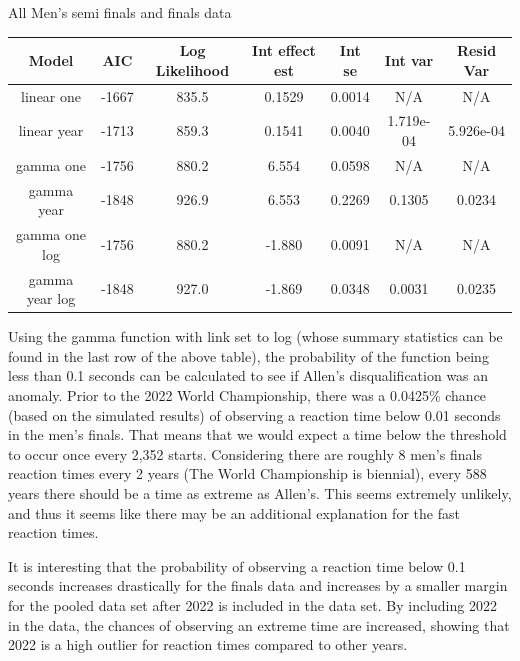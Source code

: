 \documentclass[12pt, letterpaper, titlepage]{article}
\begin{document}
All Men's semi finals and finals data
\begin{center}
  \begin{tabular}{|c  c  c  c  c  c  c |}
   \hline 
   Model & AIC & Log Likelihood & Int effect est & Int se & Int var & Resid Var \\ [0.5ex] 
   \hline\hline
   linear one & -1667 & 835.5 & 0.1529 & 0.0014 & N/A & N/A \\
   \hline
   linear year & -1713 & 859.3 & 0.1541 & 0.0040 & 1.719e-04 & 5.926e-04 \\ 
   \hline
   gamma one & -1756 & 880.2 & 6.554 & 0.0598 & N/A & N/A \\
   \hline
   gamma year & -1848 & 926.9 & 6.553 & 0.2269 & 0.1305 & 0.0234 \\
   \hline
   gamma one log & -1756 & 880.2 & -1.880 & 0.0091 & N/A & N/A \\
   \hline
   gamma year log & -1848 & 927.0 & -1.869 & 0.0348 & 0.0031 & 0.0235 \\ [0.5ex]
   \hline
  \end{tabular}
  \end{center}
Using the gamma function with link set to log (whose summary statistics can be
found in the last row of the above table), the probability of the function being
less than 0.1 seconds can be calculated to see if Allen's disqualification was an anomaly.
Prior to the 2022 World Championship, there was a 0.0425\% chance (based on the
simulated results) of observing a reaction time below 0.01 seconds in the men's
finals.  That means that we would expect a time below the threshold to occur
once every 2,352 starts.  Considering there are roughly 8 men's finals reaction
times every 2 years (The World Championship is biennial), every 588 years there
should be a time as extreme as Allen's.  This seems extremely unlikely, and thus
it seems like there may be an additional explanation for the fast reaction times.

It is interesting that the probability of observing a reaction time below 0.1
seconds increases drastically for the finals data and increases by a smaller margin
for the pooled data set after 2022 is included in the data set.  By including 2022
in the data, the chances of observing an extreme time are increased, showing that
2022 is a high outlier for reaction times compared to other years.
\end{document}
